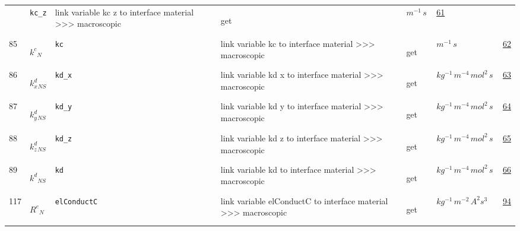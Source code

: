\begin{longtable}{|p{1cm}|p{2.5cm}|p{4.5cm}|p{8cm}|p{3.0cm}|p{3cm}|p{1cm}|}
             & \verb|kc_z|
             & link variable kc z to interface material >>> macroscopic
             & \begin{lay}get \end{lay}
             & $ m^{-1} \,s \, $
             & \hyperlink{"e:61"}{ 61 }
                 \\
    85
             & \hypertarget{"v:85"}{ $ {{k^c}}{_{N}} $}
             & \verb|kc|
             & link variable kc to interface material >>> macroscopic
             & \begin{lay}get \end{lay}
             & $ m^{-1} \,s \, $
             & \hyperlink{"e:62"}{ 62 }
                 \\
    86
             & \hypertarget{"v:86"}{ $ {{k^d_x}}{_{{N S}}} $}
             & \verb|kd_x|
             & link variable kd x to interface material >>> macroscopic
             & \begin{lay}get \end{lay}
             & $ kg^{-1} \,m^{-4} \,mol^{2} \,s \, $
             & \hyperlink{"e:63"}{ 63 }
                 \\
    87
             & \hypertarget{"v:87"}{ $ {{k^d_y}}{_{{N S}}} $}
             & \verb|kd_y|
             & link variable kd y to interface material >>> macroscopic
             & \begin{lay}get \end{lay}
             & $ kg^{-1} \,m^{-4} \,mol^{2} \,s \, $
             & \hyperlink{"e:64"}{ 64 }
                 \\
    88
             & \hypertarget{"v:88"}{ $ {{k^d_z}}{_{{N S}}} $}
             & \verb|kd_z|
             & link variable kd z to interface material >>> macroscopic
             & \begin{lay}get \end{lay}
             & $ kg^{-1} \,m^{-4} \,mol^{2} \,s \, $
             & \hyperlink{"e:65"}{ 65 }
                 \\
    89
             & \hypertarget{"v:89"}{ $ {{k^d}}{_{{N S}}} $}
             & \verb|kd|
             & link variable kd to interface material >>> macroscopic
             & \begin{lay}get \end{lay}
             & $ kg^{-1} \,m^{-4} \,mol^{2} \,s \, $
             & \hyperlink{"e:66"}{ 66 }
                 \\
    117
             & \hypertarget{"v:117"}{ $ {{R^e}}{_{N}} $}
             & \verb|elConductC|
             & link variable elConductC to interface material >>> macroscopic
             & \begin{lay}get \end{lay}
             & $ kg^{-1} \,m^{-2} \,A^{2} s^{3} \, $
             & \hyperlink{"e:94"}{ 94 }
                 \\
    \end{longtable}